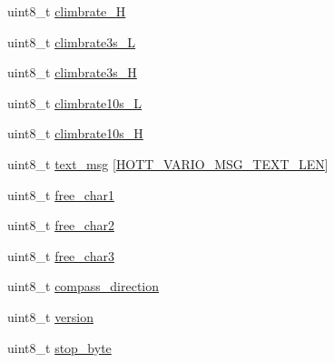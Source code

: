 \begin{DoxyCompactItemize}
\item 
uint8\+\_\+t \hyperlink{structHOTT__VARIO__MSG__s_a4bc1ed874fbfbb707809d8b7b8926559}{climbrate\+\_\+\+H}
\item 
uint8\+\_\+t \hyperlink{structHOTT__VARIO__MSG__s_a2a8cd320cfa2b12a6e5bb36a954197ea}{climbrate3s\+\_\+\+L}
\item 
uint8\+\_\+t \hyperlink{structHOTT__VARIO__MSG__s_ad119282055b6d7d9337f316cd8322773}{climbrate3s\+\_\+\+H}
\item 
uint8\+\_\+t \hyperlink{structHOTT__VARIO__MSG__s_aafa25f594419b79917ed4fcb43a47e31}{climbrate10s\+\_\+\+L}
\item 
uint8\+\_\+t \hyperlink{structHOTT__VARIO__MSG__s_af73a6c33e1c3d6acfaefe2d4b1ab52e7}{climbrate10s\+\_\+\+H}
\item 
uint8\+\_\+t \hyperlink{structHOTT__VARIO__MSG__s_a7a83addfb7aaefa875bc77fa87fe6bc8}{text\+\_\+msg} \mbox{[}\hyperlink{telemetry_2hott_8h_a4110522d0023b9139c5a3207ee0a3eee}{H\+O\+T\+T\+\_\+\+V\+A\+R\+I\+O\+\_\+\+M\+S\+G\+\_\+\+T\+E\+X\+T\+\_\+\+L\+E\+N}\mbox{]}
\item 
uint8\+\_\+t \hyperlink{structHOTT__VARIO__MSG__s_a96770dd10f5e684335a8397f8e2b5cf9}{free\+\_\+char1}
\item 
uint8\+\_\+t \hyperlink{structHOTT__VARIO__MSG__s_adaac00455c19f377aaccad51569d358a}{free\+\_\+char2}
\item 
uint8\+\_\+t \hyperlink{structHOTT__VARIO__MSG__s_af1907d6c3a20c908c568543c69d5900f}{free\+\_\+char3}
\item 
uint8\+\_\+t \hyperlink{structHOTT__VARIO__MSG__s_a15d8b8b03426077b7649775fbcca51ae}{compass\+\_\+direction}
\item 
uint8\+\_\+t \hyperlink{structHOTT__VARIO__MSG__s_a8fdbf291251788829b31513a0db12702}{version}
\item 
uint8\+\_\+t \hyperlink{structHOTT__VARIO__MSG__s_a5f7e411ed23dba50af36973eded2692e}{stop\+\_\+byte}
\end{DoxyCompactItemize}


